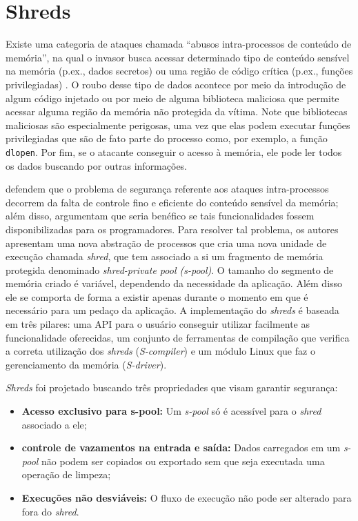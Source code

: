 \section{Shreds}
\label{sec:shreds}

Existe uma categoria de ataques chamada ``abusos intra-processos de conteúdo
de memória'', na qual o invasor busca acessar determinado tipo de conteúdo
sensível na memória (p.ex., dados secretos) ou uma região de código crítica
(p.ex., funções privilegiadas) \citep{shreds}. O roubo desse tipo de dados
acontece por meio da introdução de algum código injetado ou por meio de alguma
biblioteca maliciosa que permite acessar alguma região da memória não protegida
da vítima. Note que bibliotecas maliciosas são especialmente perigosas, uma vez
que elas podem executar funções privilegiadas que são de fato parte do
processo como, por exemplo, a função \texttt{dlopen}. Por fim, se o atacante
conseguir o acesso à memória, ele pode ler todos os dados buscando por outras
informações.

\citet{shreds} defendem que o problema de segurança referente aos ataques
intra-processos decorrem da falta de controle fino e eficiente do conteúdo
sensível da memória; além disso, argumentam que seria benéfico se tais
funcionalidades fossem disponibilizadas para os programadores. Para resolver tal
problema, os autores apresentam uma nova abstração de processos que cria uma
nova unidade de execução chamada \emph{shred}, que tem associado a si um
fragmento de memória protegida denominado \emph{shred-private pool
(s-pool)}. O tamanho do segmento de memória criado é variável,
dependendo da necessidade da aplicação. Além disso ele se comporta de forma a
existir apenas durante o momento em que é necessário para um pedaço da
aplicação. A implementação do \emph{shreds} é baseada em três pilares: uma API
para o usuário conseguir utilizar facilmente as funcionalidade oferecidas, um
conjunto de ferramentas de compilação que verifica a correta utilização dos
\emph{shreds} (\emph{S-compiler}) e um módulo Linux que faz o gerenciamento da
memória (\emph{S-driver}).

\emph{Shreds} foi projetado buscando três propriedades que visam garantir
segurança:

\begin{itemize}
  \item \textbf{Acesso exclusivo para s-pool:} Um \emph{s-pool} só é acessível
        para o \emph{shred} associado a ele;
  \item \textbf{controle de vazamentos na entrada e saída:} Dados carregados em um
        \emph{s-pool} não podem ser copiados ou exportado sem que seja
        executada uma operação de limpeza;
  \item \textbf{Execuções não desviáveis:} O fluxo de execução não pode ser
        alterado para fora do \emph{shred}.
\end{itemize}

